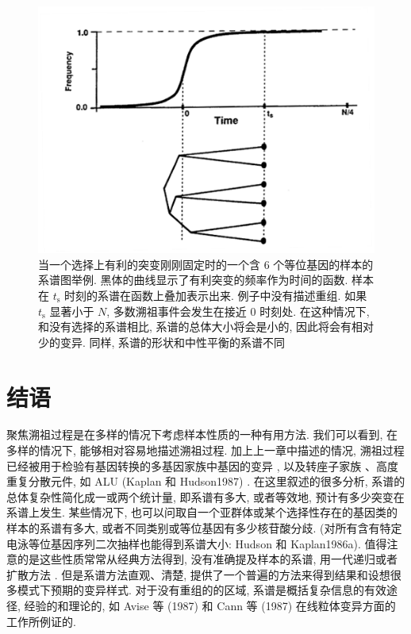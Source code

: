 \documentclass[12pt]{article}
\begin{document}
\begin{figure}
    \centering
    \includegraphics{coalescent-process.images/image10.png}
    \caption{当一个选择上有利的突变刚刚固定时的一个含 6 个等位基因的样本的系谱图举例.
        黑体的曲线显示了有利突变的频率作为时间的函数. 样本在 \(t_{\mathrm{s}}\)
        时刻的系谱在函数上叠加表示出来. 例子中没有描述重组. 如果
        \(t_{\mathrm{s}}\) 显著小于 \(N\), 多数溯祖事件会发生在接近 0 时刻处.
        在这种情况下, 和没有选择的系谱相比, 系谱的总体大小将会是小的,
    因此将会有相对少的变异. 同样, 系谱的形状和中性平衡的系谱不同}
\end{figure}

\section{结语}

聚焦溯祖过程是在多样的情况下考虑样本性质的一种有用方法. 我们可以看到, 在多样的情况下, 能够相对容易地描述溯祖过程.
加上上一章中描述的情况, 溯祖过程已经被用于检验有基因转换的多基因家族中基因的变异 \parencite{kaplan1987, Watterson1989a},
以及转座子家族 \parencite{hudson1986}、高度重复分散元件, 如 ALU (Kaplan 和
Hudson1987) . 在这里叙述的很多分析, 系谱的总体复杂性简化成一或两个统计量, 即系谱有多大, 或者等效地,
预计有多少突变在系谱上发生. 某些情况下, 也可以问取自一个亚群体或某个选择性存在的基因类的样本的系谱有多大,
或者不同类别或等位基因有多少核苷酸分歧. (对所有含有特定电泳等位基因序列二次抽样也能得到系谱大小: Hudson 和 Kaplan1986a).
值得注意的是这些性质常常从经典方法得到, 没有准确提及样本的系谱, 用一代递归或者扩散方法 \parencite{Watterson1989a}.
但是系谱方法直观、清楚, 提供了一个普遍的方法来得到结果和设想很多模式下预期的变异样式. 对于没有重组的的区域,
系谱是概括复杂信息的有效途径, 经验的和理论的, 如 Avise 等 (1987) 和 Cann 等 (1987) 在线粒体变异方面的工作所例证的.
\end{document}
